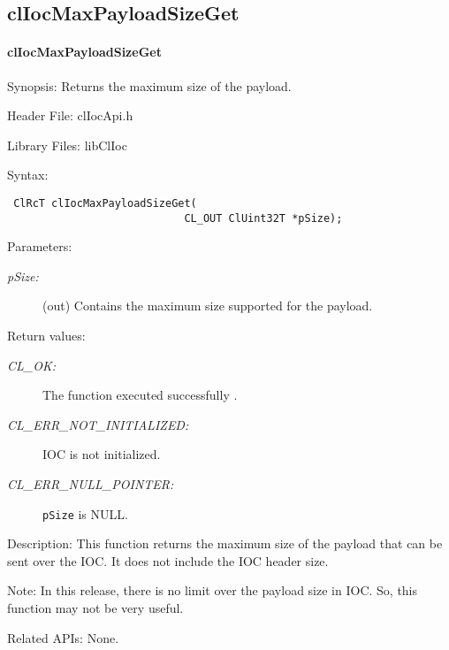 \begin{flushleft}
\subsection{clIocMaxPayloadSizeGet}
\hypertarget{pageIOC120}{}\paragraph{cl\-Ioc\-Max\-Payload\-Size\-Get}\label{pageIOC120}
\begin{Desc}
\item[Synopsis: ]Returns the maximum size of the payload.\end{Desc}
\begin{Desc}
\item[Header File:]clIocApi.h\end{Desc}
\begin{Desc}
\item[Library Files:]libClIoc\end{Desc}
\begin{Desc}
\item[Syntax: ]

\footnotesize\begin{verbatim} ClRcT clIocMaxPayloadSizeGet( 
                  			CL_OUT ClUint32T *pSize); 
\end{verbatim}
\normalsize
\end{Desc}
\begin{Desc}
\item[Parameters:]
\begin{description}
\item[{\em p\-Size:}](out) Contains the maximum size supported for the payload. \end{description}
\end{Desc}
\begin{Desc}
\item[Return values:]
\begin{description}
\item[{\em CL\_\-OK:}]The function executed successfully . \item[{\em CL\_\-ERR\_\-NOT\_\-INITIALIZED:}] IOC is not initialized. 
\item[{\em CL\_\-ERR\_\-NULL\_\-POINTER:}] {\tt{p\-Size}} is NULL.\end{description}
\end{Desc}
\begin{Desc}
\item[Description:]This function returns the maximum size of the payload that can be sent over the IOC. It does not include the IOC header size.\end{Desc}
\begin{Desc}
\item[Note:]In this release, there is no limit over the payload size in IOC. So, this function may not be very useful.\end{Desc}
\begin{Desc}
\item[Related APIs:]None.\end{Desc}
\newpage




\end{flushleft}
